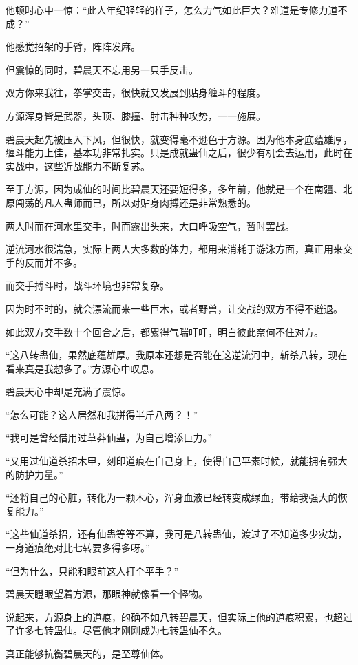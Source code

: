 \begin{this_body}
他顿时心中一惊：“此人年纪轻轻的样子，怎么力气如此巨大？难道是专修力道不成？”

他感觉招架的手臂，阵阵发麻。

但震惊的同时，碧晨天不忘用另一只手反击。

双方你来我往，拳掌交击，很快就又发展到贴身缠斗的程度。

方源浑身皆是武器，头顶、膝撞、肘击种种攻势，一一施展。

碧晨天起先被压入下风，但很快，就变得毫不逊色于方源。因为他本身底蕴雄厚，缠斗能力上佳，基本功非常扎实。只是成就蛊仙之后，很少有机会去运用，此时在实战中，这些近战能力不断复苏。

至于方源，因为成仙的时间比碧晨天还要短得多，多年前，他就是一个在南疆、北原闯荡的凡人蛊师而已，所以对贴身肉搏还是非常熟悉的。

两人时而在河水里交手，时而露出头来，大口呼吸空气，暂时罢战。

逆流河水很湍急，实际上两人大多数的体力，都用来消耗于游泳方面，真正用来交手的反而并不多。

而交手搏斗时，战斗环境也非常复杂。

因为时不时的，就会漂流而来一些巨木，或者野兽，让交战的双方不得不避退。

如此双方交手数十个回合之后，都累得气喘吁吁，明白彼此奈何不住对方。

“这八转蛊仙，果然底蕴雄厚。我原本还想是否能在这逆流河中，斩杀八转，现在看来真是我想多了。”方源心中叹息。

碧晨天心中却是充满了震惊。

“怎么可能？这人居然和我拼得半斤八两？！”

“我可是曾经借用过草莽仙蛊，为自己增添巨力。”

“又用过仙道杀招木甲，刻印道痕在自己身上，使得自己平素时候，就能拥有强大的防护力量。”

“还将自己的心脏，转化为一颗木心，浑身血液已经转变成绿血，带给我强大的恢复能力。”

“这些仙道杀招，还有仙蛊等等不算，我可是八转蛊仙，渡过了不知道多少灾劫，一身道痕绝对比七转要多得多呀。”

“但为什么，只能和眼前这人打个平手？”

碧晨天瞪眼望着方源，那眼神就像看一个怪物。

说起来，方源身上的道痕，的确不如八转碧晨天，但实际上他的道痕积累，也超过了许多七转蛊仙。尽管他才刚刚成为七转蛊仙不久。

真正能够抗衡碧晨天的，是至尊仙体。


\end{this_body}

